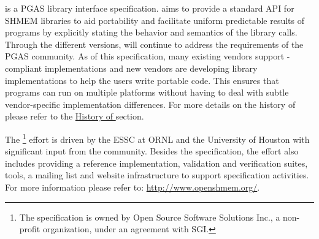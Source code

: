 \openshmem is a \ac{PGAS} library interface specification. \openshmem aims to
provide a standard \ac{API} for SHMEM libraries to aid portability and
facilitate uniform predictable results of \openshmem programs by explicitly
stating the behavior and semantics of the \openshmem library calls. Through the
different versions, \openshmem will continue to address the requirements of the
\ac{PGAS} community.  As of this specification, many existing vendors support
\openshmem-compliant implementations and new vendors are developing
\openshmem library implementations to help the users write portable \openshmem
code. This ensures that programs can run on multiple platforms without having to
deal with subtle vendor-specific implementation differences. For more details on
the history of \openshmem please refer to the
\hyperref[sec:openshmem_history]{History of \openshmem} section.  

The \openshmem\footnote{The \openshmem specification is owned by Open Source
Software Solutions Inc., a non-profit organization, under an agreement with
SGI.}  effort is driven by the \ac{ESSC} at \ac{ORNL} and the University of
Houston with significant input from the \openshmem community. Besides the
specification, the effort also includes providing a reference \openshmem
implementation, validation and verification suites, tools, a mailing list and
website infrastructure to support specification activities. For more information
please refer to: \url{http://www.openshmem.org/}.
